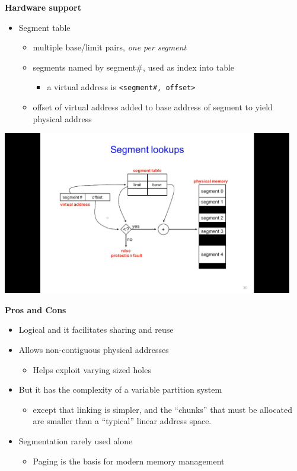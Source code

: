 \documentclass[11pt,a4paper]{article}
\begin{document}
\textbf{Hardware support}
\begin{itemize}
    \item Segment table
        \begin{itemize}
            \item multiple base/limit pairs, \emph{one per segment}
            \item segments named by segment\#, used as index into table
                \begin{itemize}
                    \item a virtual address is \texttt{<segment\#, offset>}
                \end{itemize}
            \item offset of virtual address added to base address of segment to yield
                physical address
        \end{itemize}
\end{itemize}

\includegraphics[height=270]{segment-lookups.jpg}

\textbf{Pros and Cons}
\begin{itemize}
    \item Logical and it facilitates sharing and reuse
    \item Allows non-contiguous physical addresses
        \begin{itemize}
            \item Helps exploit varying sized holes
        \end{itemize}
    \item But it has the complexity of a variable partition system
        \begin{itemize}
            \item except that linking is simpler, and the ``chunks'' that must be allocated
                are smaller than a ``typical'' linear address space.
        \end{itemize}
    \item Segmentation rarely used alone
        \begin{itemize}
            \item Paging is the basis for modern memory management
        \end{itemize}
\end{itemize}
\end{document}

